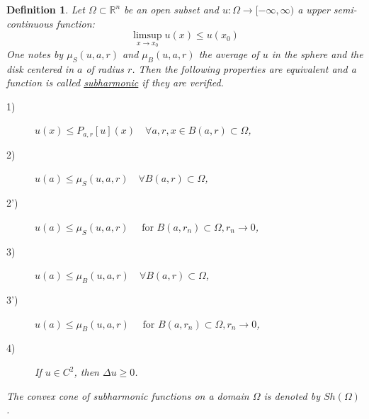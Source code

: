 \documentclass[11pt]{article}
\newtheorem{definition}{Definition}
\begin{document}
\begin{definition}
Let \(\Omega\subset \mathbb{R}^n\) be an open subset and \(u: \Omega \longrightarrow
[-\infty,\infty)\) a upper semi-continuous function: \[ \limsup_{x \to x_0}u(x) \leq
u(x_0) \] 
One notes by \(\mu_S(u,a,r)\) and \(\mu_B(u,a,r)\) the average of \(u\) in the
sphere and the disk centered in \(a\) of radius \(r\). Then the following properties are equivalent and a function is called
\uline{subharmonic} if they are verified.
\begin{description}
\item[{1)}] \(u(x) \leq P_{a,r}[u](x) \quad \forall a,r, x\in B(a,r)\subset \Omega\),
\item[{2)}] \(u(a) \leq \mu_S(u,a,r)\quad \forall B(a,r)\subset\Omega\),
\item[{2')}] \(u(a) \leq \mu_S(u,a,r)\quad \text{ for } B(a,r_n)\subset\Omega, r_n\to 0\),
\item[{3)}] \(u(a) \leq \mu_B(u,a,r)\quad \forall B(a,r)\subset \Omega\),
\item[{3')}] \(u(a) \leq \mu_B(u,a,r)\quad \text{ for } B(a,r_n)\subset \Omega, r_n\to 0\),
\item[{4)}] If \(u\in C^2\), then \(\Delta u \geq 0\).
\end{description}
The convex cone of subharmonic functions on a domain \(\Omega\) is denoted by \(Sh(\Omega)\).
\end{definition}
\end{document}
